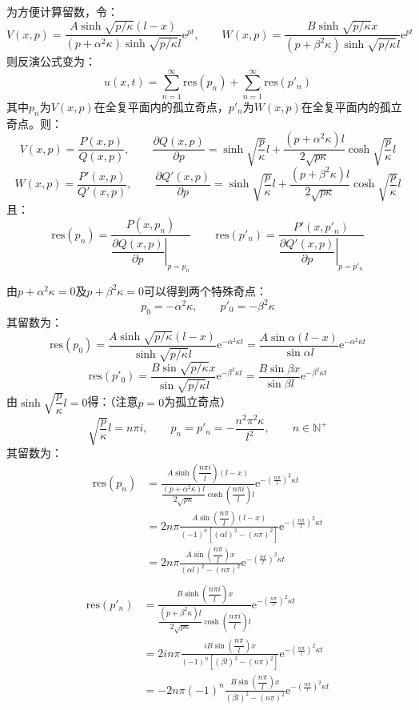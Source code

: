 \documentclass[a4paper,fontset=windows]{ctexart}
\begin{document}
\begin{itemize}
为方便计算留数，令：
\[
V(x,p) = \frac{A\sinh\sqrt{p/\kappa}(l-x)}{(p+\alpha^2\kappa)\sinh\sqrt{p/\kappa}l}\mathrm{e}^{pt},\qquad W(x,p) = \frac{B\sinh\sqrt{p/\kappa}x}{(p+\beta^2\kappa)\sinh\sqrt{p/\kappa}l}\mathrm{e}^{pt}
\]
则反演公式变为：
\[
u(x,t) = \sum_{n=1}^{\infty}\mathrm{res}(p_n) + \sum_{n=1}^{\infty}\mathrm{res}(p'_n)
\]
其中$p_n$为$V(x,p)$在全复平面内的孤立奇点，$p'_n$为$W(x,p)$在全复平面内的孤立奇点。则：
\[
V(x,p) = \frac{P(x,p)}{Q(x,p)},\qquad \frac{\partial Q(x,p)}{\partial p} = \sinh\sqrt{\dfrac{p}{\kappa}}l + \frac{(p+\alpha^2\kappa)l}{2\sqrt{p\kappa}}\cosh\sqrt{\dfrac{p}{\kappa}}l
\]
\[
W(x,p) = \frac{P'(x,p)}{Q'(x,p)},\qquad \frac{\partial Q'(x,p)}{\partial p} = \sinh\sqrt{\dfrac{p}{\kappa}}l + \frac{(p+\beta^2\kappa)l}{2\sqrt{p\kappa}}\cosh\sqrt{\dfrac{p}{\kappa}}l
\]
且：
\[
\mathrm{res}(p_n) = \frac{P(x,p_n)}{\left.\dfrac{\partial Q(x,p)}{\partial p}\right|_{p = p_n}}\,\qquad \mathrm{res}(p'_n) = \frac{P'(x,p'_n)}{\left.\dfrac{\partial Q'(x,p)}{\partial p}\right|_{p = p'_n}}
\]

由$p+\alpha^2\kappa = 0$及$p+\beta^2\kappa = 0$可以得到两个特殊奇点：
\[
p_0 = -\alpha^2\kappa,\qquad p'_0 = -\beta^2\kappa
\]
其留数为：
\[
\mathrm{res}(p_0) = \frac{A\sinh\sqrt{p/\kappa}(l-x)}{\sinh\sqrt{p/\kappa}l}\mathrm{e}^{-\alpha^2\kappa t} = \frac{A\sin\alpha(l-x)}{\sin\alpha l}\mathrm{e}^{-\alpha^2\kappa t}
\]
\[
\mathrm{res}(p'_0) = \frac{B\sin\sqrt{p/\kappa}x}{\sin\sqrt{p/\kappa}l}\mathrm{e}^{-\beta^2\kappa t} = \frac{B\sin\beta x}{\sin\beta l}\mathrm{e}^{-\beta^2\kappa t}
\]
由$\sinh\sqrt{\dfrac{p}{\kappa}}l = 0$得：（注意$p=0$为孤立奇点）
\[
\sqrt{\dfrac{p}{\kappa}}l = n\pi i,\qquad p_n = p'_n = -\frac{n^2\pi^2\kappa}{l^2},\qquad n \in \mathbb{N}^+
\]
其留数为：
\begin{align*}
\mathrm{res}(p_n)
&= \frac{A\sinh(\dfrac{n\pi i}{l})(l-x)}{\dfrac{(p+\alpha^2\kappa)l}{2\sqrt{p\kappa}}\cosh(\dfrac{n\pi i}{l})l}\mathrm{e}^{-\left(\tfrac{n\pi}{l}\right)^{2}\kappa t} \\
&= 2n\pi\frac{A\sin(\dfrac{n\pi}{l})(l-x)}{(-1)^n\left[(\alpha l)^2-(n\pi)^2\right]}\mathrm{e}^{-\left(\tfrac{n\pi}{l}\right)^{2}\kappa t} \\
&= 2n\pi\frac{A\sin(\dfrac{n\pi}{l})x}{(\alpha l)^2-(n\pi)^2}\mathrm{e}^{-\left(\tfrac{n\pi}{l}\right)^{2}\kappa t} \\
\end{align*}
\begin{align*}
\mathrm{res}(p'_n)
&= \frac{B\sinh(\dfrac{n\pi i}{l})x}{\dfrac{(p+\beta^2\kappa)l}{2\sqrt{p\kappa}}\cosh(\dfrac{n\pi i}{l})l}\mathrm{e}^{-\left(\tfrac{n\pi}{l}\right)^{2}\kappa t} \\
&= 2in\pi\frac{iB\sin(\dfrac{n\pi}{l})x}{(-1)^n\left[(\beta l)^2-(n\pi)^2\right]}\mathrm{e}^{-\left(\tfrac{n\pi}{l}\right)^{2}\kappa t} \\
&= -2n\pi(-1)^n\frac{B\sin(\dfrac{n\pi}{l})x}{(\beta l)^2-(n\pi)^2}\mathrm{e}^{-\left(\tfrac{n\pi}{l}\right)^{2}\kappa t} \\
\end{align*}


\end{itemize}
\end{document}

